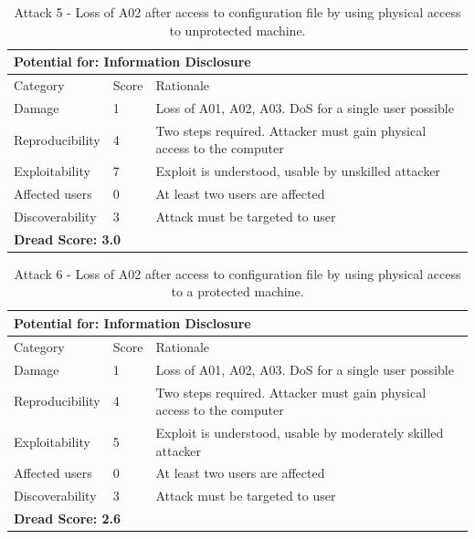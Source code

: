 \documentclass [11pt, proquest] {uwthesis}[2020/02/24]
\begin{document}
\begin{table}[H]
\label{attack5-hsm}
\begin{tabular}{|m{3cm}|m{.9cm}|p{27em} |}
\multicolumn{3}{l}{Potential for: Information Disclosure}                   \\
\hline
Category & Score & Rationale \\
\hline
Damage          & 1     & Loss of A01, A02, A03. DoS for a single user possible            \\
\hline
Reproducibility & 4     & Two steps required. Attacker must gain physical access to the computer     \\
\hline
Exploitability & 7      & Exploit is understood, usable by unskilled attacker \\
\hline
Affected users  & 0     & At least two users are affected                      \\
\hline
Discoverability & 3     & Attack must be targeted to user \\
\hline
\multicolumn{3}{l}{\textbf{Dread Score: 3.0}} 
\end{tabular}
\caption{Attack 5 - Loss of A02 after access to configuration file by using physical access to unprotected machine. }
\end{table}

\begin{table}[H]
\label{attack6-hsm}
\begin{tabular}{|m{3cm}|m{.9cm}|p{27em} |}
\multicolumn{3}{l}{Potential for: Information Disclosure}                   \\
\hline
Category & Score & Rationale \\
\hline
Damage          & 1     & Loss of A01, A02, A03. DoS for a single user possible            \\
\hline
Reproducibility & 4     & Two steps required. Attacker must gain physical access to the computer     \\
\hline
Exploitability & 5      & Exploit is understood, usable by moderately skilled attacker  \\
\hline
Affected users  & 0     & At least two users are affected                      \\
\hline
Discoverability & 3     & Attack must be targeted to user \\
\hline
\multicolumn{3}{l}{\textbf{Dread Score: 2.6}} 
\end{tabular}
\caption{Attack 6 - Loss of A02 after access to configuration file by using physical access to a protected machine. }
\end{table}
\end{document}
